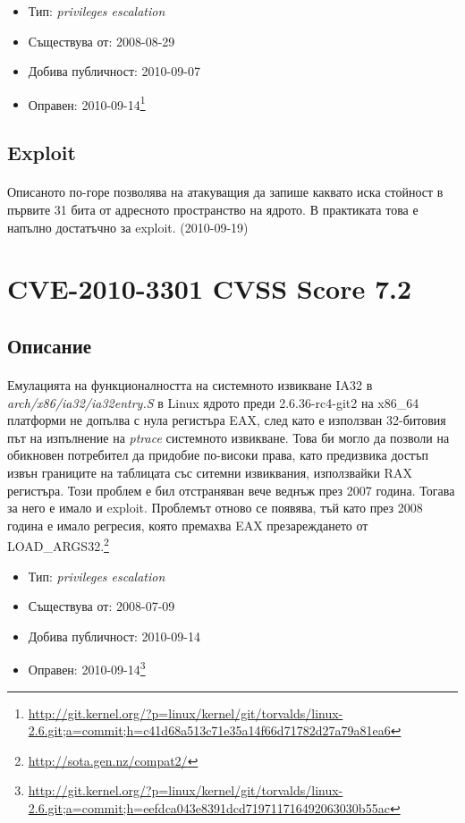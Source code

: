 \documentclass[a4paper,12pt,leqno]{article}
\begin{document}
\begin{itemize}
    \item Тип: \textit{privileges escalation}
    \item Съществува от: 2008-08-29
  	\item Добива публичност: 2010-09-07
    \item Оправен: 2010-09-14\footnote{\url{http://git.kernel.org/?p=linux/kernel/git/torvalds/linux-2.6.git;a=commit;h=c41d68a513c71e35a14f66d71782d27a79a81ea6}}
\end{itemize}

\subsection{Exploit}
\paragraph{}
Описаното по-горе позволява на атакуващия да запише каквато иска стойност в първите 31 бита от адресното пространство на ядрото. В практиката това е напълно достатъчно за exploit. (2010-09-19)

\section{CVE-2010-3301 CVSS Score 7.2}
\subsection{Описание}
\paragraph{}
Емулацията на функционалността на системното извикване IA32 в\\ \textit{arch/x86/ia32/ia32entry.S} в Linux ядрото преди 2.6.36-rc4-git2 на x86\_64 платформи не допълва с нула регистъра EAX, след като е използван 32-битовия път на изпълнение на \textit{ptrace} системното извикване. Това би могло да позволи на обикновен потребител да придобие по-високи права, като предизвика достъп извън границите на таблицата със ситемни извиквания, използвайки RAX регистъра. Този проблем е бил отстраняван вече веднъж през 2007 година. Тогава за него е имало и exploit. Проблемът отново се появява, тъй като през 2008 година е имало регресия, която премахва EAX презареждането от LOAD\_ARGS32.\footnote{\url{http://sota.gen.nz/compat2/}}

\begin{itemize}
    \item Тип: \textit{privileges escalation}
    \item Съществува от: 2008-07-09
  	\item Добива публичност: 2010-09-14
    \item Оправен: 2010-09-14\footnote{\url{http://git.kernel.org/?p=linux/kernel/git/torvalds/linux-2.6.git;a=commit;h=eefdca043e8391dcd719711716492063030b55ac}}
\end{itemize}
\end{document}
